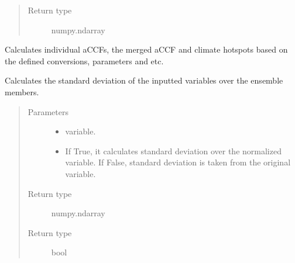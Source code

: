\documentclass[a4paper,11pt,english]{sphinxmanual}
\begin{document}
\begin{fulllineitems}
\begin{fulllineitems}
\begin{quote}
\begin{description}
\item[{Return type}] \leavevmode
numpy.ndarray

\end{description}\end{quote}

\end{fulllineitems}


\begin{fulllineitems}
\label{\detokenize{modules:envlib.accf.GeTaCCFs.get_accfs}}
Calculates individual aCCFs, the merged aCCF and climate hotspots based on the defined conversions, parameters and etc.

\end{fulllineitems}


\begin{fulllineitems}
\label{\detokenize{modules:envlib.accf.GeTaCCFs.get_std}}
Calculates the standard deviation of the inputted variables over the ensemble members.
\begin{quote}\begin{description}
\item[{Parameters}] \leavevmode\begin{itemize}
\item {} 
 \textendash{} variable.

\item {} 
 \textendash{} If True, it calculates standard deviation over the normalized variable. If False, standard deviation is taken from the original variable.

\end{itemize}

\item[{Return type}] \leavevmode
numpy.ndarray

\item[{Return type}] \leavevmode
bool


\end{description}
\end{quote}
\end{fulllineitems}
\end{fulllineitems}
\end{document}
